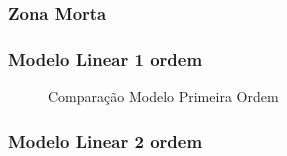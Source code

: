 \documentclass[a4paper,11pt]{article}
\begin{document}
\inputminted{matlab}{../src/matlab/dcMotor.m}

\subsubsection{Zona Morta}
\subsubsection{Modelo Linear 1 ordem}

\begin{figure}[H]
    \centering
    \caption{Comparação Modelo Primeira Ordem}
    \label{fig:other_figure}
\end{figure}

\subsubsection{Modelo Linear 2 ordem}








\end{document}
